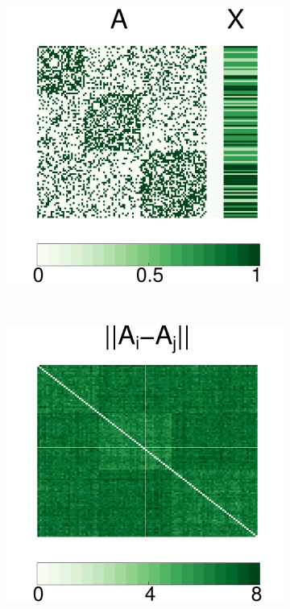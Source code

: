 \documentclass[12pt]{article}
\theoremstyle{definition}
\begin{document}
\begin{figure}[H]
\begin{subfigure}[b]{0.23\textwidth}
		\includegraphics[width=\textwidth]{../../Figure/Amat.pdf}
			\caption{}
		\label{fig:b}
	\end{subfigure}
	~ %
	\begin{subfigure}[b]{0.23\textwidth}
		\includegraphics[width=\textwidth]{../../Figure/distA.pdf}

\end{subfigure}
\end{figure}
\end{document}
